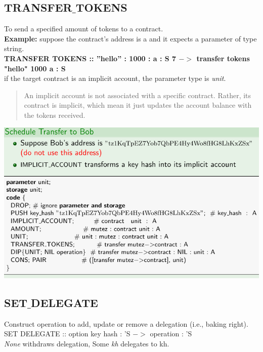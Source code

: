 \documentclass{article}
\begin{document}
\subsection{TRANSFER$\_$TOKENS}
To send a specified amount of tokens to a contract.\\
\textbf{Example: }suppose the contract’s address is a and it expects a parameter of type string.\\
\textbf{TRANSFER TOKENS :: ”hello” : 1000 : a : S 7 $->$ transfer tokens "hello" 1000 a : S}\\
if the target contract is an implicit account, the parameter type is \textit{unit}.
\begin{quote}
An implicit account is not associated with a specific contract. Rather, its contract is implicit, which mean it just updates the account balance with the tokens received.
\end{quote}
\includegraphics[scale=0.3]{78.png}
\subsection{SET$\_$DELEGATE}
Construct operation to add, update or remove a delegation (i.e., baking right).\\
SET DELEGATE  :: option key hash : 'S $->$ operation : 'S\\
\textit{None} withdraws delegation, Some \textit{kh}  delegates to kh.
\end{document}
